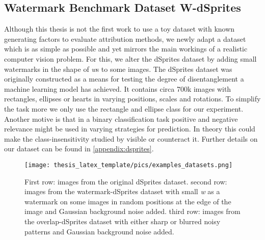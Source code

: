 \subsection{Watermark Benchmark Dataset W-dSprites}\label{section:dataset_wdsprites}
Although this thesis is not the first work to use a toy dataset with known generating factors to evaluate attribution methods, we newly adapt a dataset which is as simple as possible and yet mirrors the main workings of a realistic computer vision problem. For this, we alter the dSprites dataset \citep{dsprites17} by adding small watermarks in the shape of \textit{w}s to some images. The dSprites dataset was originally constructed as a means for testing the degree of disentanglement a machine learning model has achieved. It contains circa 700k images with rectangles, ellipses or hearts in varying positions, scales and rotations. To simplify the task more we only use the rectangle and ellipse class for our experiment. Another motive is that in a binary classification task positive and negative relevance might be used in varying strategies for prediction. In theory this could make the class-insensitivity studied by \citet{Sixt2020} visible or counteract it. Further details on our dataset can be found in \cref{appendix:dsprites}.

\begin{figure}[t!]
    \centering
    \texttt{[image: thesis\_latex\_template/pics/examples\_datasets.png]}
    \caption[Example Images W-dSprites Watermark Scenario]{First row: images from the original dSprites dataset. 
    second row: images from the watermark-dSprites dataset with small \textit{w} as a watermark on some images in random positions at the edge of the image and Gaussian background noise added. 
    third row: images from the overlap-dSprites dataset with either sharp or blurred noisy patterns and Gaussian background noise added.}
    \label{fig:dsprites_examples}
\end{figure}

